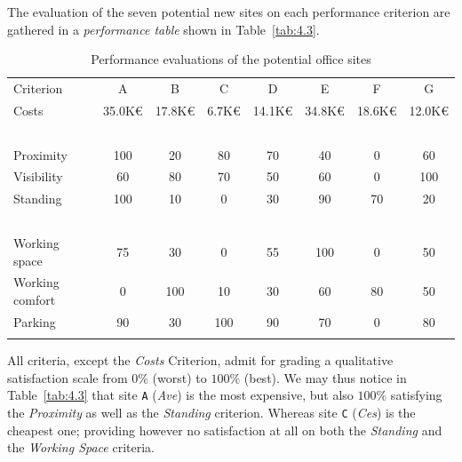 The evaluation of the seven potential new sites on each performance criterion are gathered in a \emph{performance table} shown in Table~\vref{tab:4.3}.
\begin{table}[h]
\caption{Performance evaluations of the potential office sites}
\label{tab:4.3}       %
\begin{center}
    \begin{tabular}{l|c|c|c|c|c|c|c}
      \svhline\noalign{\smallskip}
    Criterion  &    A  &      B &       C &       D &       E &        F &        G\\
       \noalign{\smallskip}\hline\noalign{\smallskip}

    Costs      &   35.0K€ &  17.8K€  & 6.7K€  &  14.1K€ &  34.8K€ &  18.6K€ &  12.0K€\\
    \          &   \      &  \     &   \     &   \    &    \    &    \    &    \ \\
    Proximity     &   100    &  20 &      80    &   70    &   40    &   0    &    60 \\
    Visibility     &   60     &  80  &     70    &   50    &   60    &   0    &    100 \\
    Standing      &   100   &   10   &    0     &   30    &   90    &   70   &    20 \\
    \           &   \     &   \    &    \     &   \     &   \     &   \    &    \  \\
    Working space      &   75    &   30   &    0     &   55    &   100   &   0    &    50  \\
    Working comfort      &   0     &   100  &    10    &   30    &   60    &   80   &    50 \\
    Parking     &   90    &   30   &    100   &   90    &   70    &   0    &    80 \\
      \noalign{\smallskip}\hline
    \end{tabular}
  \end{center}
\end{table}

All criteria, except the \emph{Costs} Criterion, admit for grading a qualitative satisfaction scale from $0\%$ (worst) to $100\%$ (best). We may thus notice in Table~\vref{tab:4.3} that site \texttt{A} (\emph{Ave}) is the most expensive, but also $100\%$ satisfying the \emph{Proximity} as well as the  \emph{Standing} criterion. Whereas site \texttt{C} (\emph{Ces}) is the cheapest one; providing however no satisfaction at all on both the \emph{Standing} and the \emph{Working Space} criteria.

